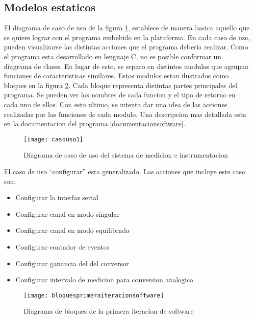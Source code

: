 \subsection{Modelos estaticos} %
\label{it2:sub:modelos_estaticos}

El diagrama de caso de uso de la figura \ref{fig:casouso1}, establece de manera basica aquello que se quiere lograr con el programa embebido en la plataforma. En cada caso de uso, pueden visualizarse las distintas acciones que el programa deberia realizar. Como el programa esta desarrollado en lenguaje C, no es posible conformar un diagrama de clases. En lugar de esto, se separo en distintos modulos que agrupan funciones de caracteristicas similares. Estos modulos estan ilustrados como bloques en la figura \ref{fig:bloquesprimeraiteracionsoftware}. Cada bloque representa distintas partes principales del programa. Se pueden ver los nombres de cada funcion y el tipo de retorno en cada uno de ellos. Con esto ultimo, se intenta dar una idea de las acciones realizadas por las funciones de cada modulo. Una descripcion mas detallada esta en la documentacion del programa \ref{documentacionsoftware}.

\begin{figure}[h]
  \centering
  \texttt{[image: casouso1]}
  \caption{Diagrama de caso de uso del sistema de medicion e instrumentacion}\label{fig:casouso1}
\end{figure}

El caso de uso ``configurar'' esta generalizado. Las acciones que incluye este caso son:
\begin{itemize}
  \item Configurar la interfaz serial
  \item Configurar canal en modo singular
  \item Configurar canal en modo equilibrado
  \item Configurar contador de eventos
  \item Configurar ganancia del del conversor
  \item Configurar intervalo de medicion para conversion analogica
\end{itemize}


\begin{figure}[h]
  \centering
  \texttt{[image: bloquesprimeraiteracionsoftware]}
  \caption{Diagrama de bloques de la primera iteracion de software}\label{fig:bloquesprimeraiteracionsoftware}
\end{figure}

